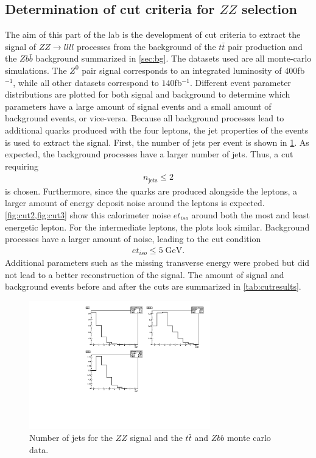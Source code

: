 \documentclass[twoside,        %
               BCOR12mm,       %
               ngerman,english, %
               fleqn,headsepline=false,footsepline=false
              ]{Vorlage/MFPREPORT}
\begin{document}
\subsection{Determination of cut criteria for $ZZ$ selection}
The aim of this part of the lab is the development of cut criteria to extract
the signal of $ZZ\rightarrow llll$ processes from the background of the $t\bar
t$ pair production and the $Z b\bar b$ background summarized in \cref{sec:bg}.
The datasets used are all monte-carlo simulations. The $Z^0$ pair signal
corresponds to an integrated luminosity of 400\;fb$^{-1}$, while all other
datasets correspond to $140$\;fb$^{-1}$. Different event parameter
distributions are plotted for both signal and background to determine which
parameters have a large amount of signal events and a small amount of
background events, or vice-versa. Because all background processes lead
to additional quarks produced with the four leptons, the jet properties of the
events is used to extract the signal. First, the number of jets per event is
shown in \cref{fig:cut1}. As expected, the background processes have a larger
number of jets. Thus, a cut requiring
\begin{align}
n_{\text{jets}}\leq2 
\label{eq:cut1}
\end{align}
is chosen. Furthermore, since the quarks are produced alongside the leptons, a
larger amount of energy deposit noise around the leptons is expected.
\cref{fig:cut2,fig:cut3} show this calorimeter noise $et_{iso}$ around both the most and
least energetic lepton. For the intermediate leptons, the plots look similar.
Background processes have a larger amount of noise, leading to the cut
condition 
\begin{align}
    et_{iso}\leq5\;\text{GeV.}
\label{eq:cut2}
\end{align}
Additional parameters such as the missing transverse energy were probed but did
not lead to a better reconstruction of the signal.
The amount of signal and background events before and after the cuts are
summarized in \ref{tab:cutresults}.
\begin{figure}[h!]
    \begin{center}
        \includegraphics[width=0.7\textwidth]{ZZ/njets_uncut}
    \end{center}
    \caption{Number of jets for the $ZZ$ signal and the $t\bar t$ and $Zbb$
    monte carlo data.}
    \label{fig:cut1}
\end{figure}
\end{document}
